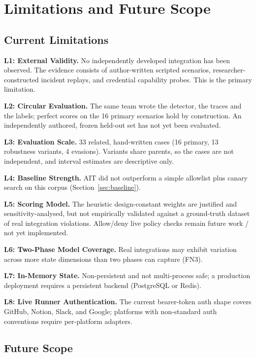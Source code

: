 \documentclass[12pt,a4paper]{report}
\begin{document}
\chapter{Limitations and Future Scope}

\section{Current Limitations}

\textbf{L1: External Validity.}
No independently developed integration has been observed. The evidence consists of
author-written scripted scenarios, researcher-constructed incident replays, and credential
capability probes. This is the primary limitation.

\textbf{L2: Circular Evaluation.}
The same team wrote the detector, the traces and the labels; perfect scores on the 16 primary
scenarios hold by construction. An independently authored, frozen held-out set has not yet been
evaluated.

\textbf{L3: Evaluation Scale.}
33 related, hand-written cases (16 primary, 13 robustness variants, 4 evasions). Variants share
parents, so the cases are not independent, and interval estimates are descriptive only.

\textbf{L4: Baseline Strength.}
AIT did not outperform a simple allowlist plus canary search on this corpus
(Section~\ref{sec:baseline}).

\textbf{L5: Scoring Model.}
The heuristic design-constant weights are justified and sensitivity-analysed, but not empirically validated
against a ground-truth dataset of real integration violations. Allow/deny live policy checks remain
future work / not yet implemented.

\textbf{L6: Two-Phase Model Coverage.}
Real integrations may exhibit variation across more state dimensions than two phases can capture
(FN3).

\textbf{L7: In-Memory State.}
Non-persistent and not multi-process safe; a production deployment requires a persistent backend
(PostgreSQL or Redis).

\textbf{L8: Live Runner Authentication.}
The current bearer-token auth shape covers GitHub, Notion, Slack, and Google; platforms with
non-standard auth conventions require per-platform adapters.

\section{Future Scope}
\end{document}
